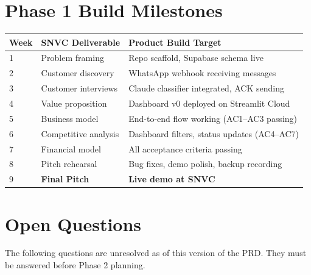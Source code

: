 \documentclass[11pt, a4paper]{article}
\begin{document}
\section{Phase 1 Build Milestones}

\begin{tabularx}{\linewidth}{llX}
\toprule
\textbf{Week} & \textbf{SNVC Deliverable} & \textbf{Product Build Target} \\
\midrule
1 & Problem framing    & Repo scaffold, Supabase schema live \\
2 & Customer discovery & WhatsApp webhook receiving messages \\
3 & Customer interviews & Claude classifier integrated, ACK sending \\
4 & Value proposition  & Dashboard v0 deployed on Streamlit Cloud \\
5 & Business model     & End-to-end flow working (AC1--AC3 passing) \\
6 & Competitive analysis & Dashboard filters, status updates (AC4--AC7) \\
7 & Financial model    & All acceptance criteria passing \\
8 & Pitch rehearsal    & Bug fixes, demo polish, backup recording \\
9 & \textbf{Final Pitch} & \textbf{Live demo at SNVC} \\
\bottomrule
\end{tabularx}

\newpage

\section{Open Questions}

The following questions are unresolved as of this version of the PRD. They must be answered before Phase 2 planning.
\end{document}
